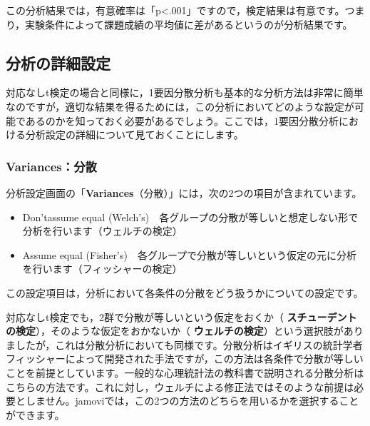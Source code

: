 \documentclass[
  12pt,
  a5jpaper,
  lualatex, ja=standard]{bxjsbook}
\providecommand{\tightlist}{%
  \setlength{\itemsep}{0pt}\setlength{\parskip}{0pt}}
\renewcommand{\emph}[1]{\textbf{\color{emph} #1}}
\newenvironment{jmvsettings}{%
	\begin{center}%
	\begin{tcolorbox}[%
		title=設定項目,
		colframe=gmoji,
		colbacktitle=gmoji,
		colback=gmoji!2!white,
		breakable,
		width=.9\textwidth,
		]\small\addtolength{\leftmargini}{-3\labelsep}%
	}%
	{\end{tcolorbox}\end{center}}
\begin{document}
この分析結果では，有意確率は「p\textless.001」ですので，検定結果は有意です。つまり，実験条件によって課題成績の平均値に差があるというのが分析結果です。

\hypertarget{sub:ANOVA-oneway-details}{%
\subsection{分析の詳細設定}\label{sub:ANOVA-oneway-details}}

対応なしt検定の場合と同様に，1要因分散分析も基本的な分析方法は非常に簡単なのですが，適切な結果を得るためには，この分析においてどのような設定が可能であるのかを知っておく必要があるでしょう。ここでは，1要因分散分析における分析設定の詳細について見ておくことにします。

\hypertarget{variancesux5206ux6563}{%
\subsubsection*{Variances：分散}\label{variancesux5206ux6563}}

分析設定画面の「\textbf{Variances}（分散）」には，次の2つの項目が含まれています。

\begin{jmvsettings}

\begin{itemize}
\tightlist
\item
  Don'tassume equal (Welch's)　各グループの分散が等しいと想定しない形で分析を行います（ウェルチの検定）
\item
  Assume equal (Fisher's)　各グループで分散が等しいという仮定の元に分析を行います（フィッシャーの検定）
\end{itemize}

\end{jmvsettings}

この設定項目は，分析において各条件の分散をどう扱うかについての設定です。

対応なしt検定でも，2群で分散が等しいという仮定をおくか（\emph{スチューデントの検定}），そのような仮定をおかないか（\emph{ウェルチの検定}）という選択肢がありましたが，これは分散分析においても同様です。分散分析はイギリスの統計学者フィッシャーによって開発された手法ですが，この方法は各条件で分散が等しいことを前提としています。一般的な心理統計法の教科書で説明される分散分析はこちらの方法です。これに対し，ウェルチによる修正法ではそのような前提は必要としません。jamoviでは，この2つの方法のどちらを用いるかを選択することができます。
\end{document}
